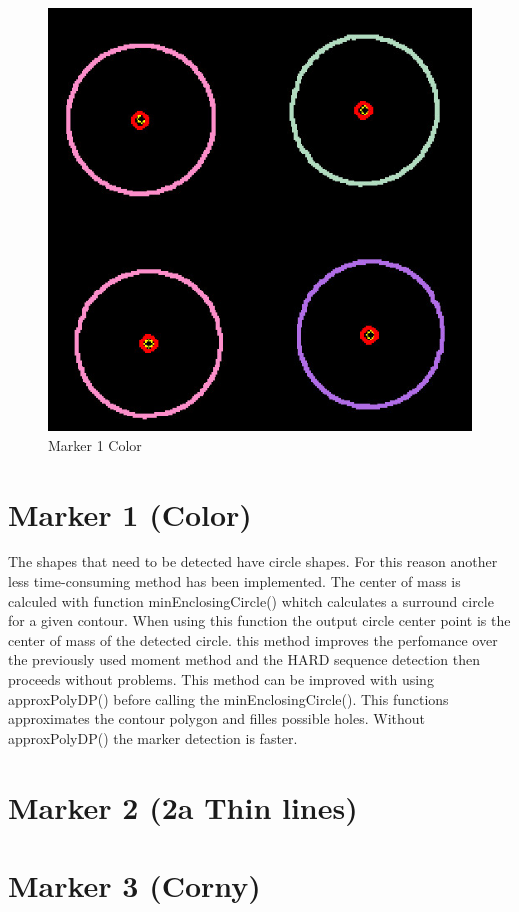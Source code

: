 \begin{figure}[ht!]
	\centering
	\includegraphics[width=\textwidth]{figures/Marker1centers}
	\caption{Marker 1 Color}
	\label{fig:markerColorcenter1}
\end{figure}
\section{Marker 1 (Color)} 

The shapes that need to be detected have circle shapes. For this reason another less time-consuming 
method has been implemented. The center of mass is calculed with function minEnclosingCircle() whitch calculates
a surround circle for a given contour. When using this function the output circle center point is the
center of mass of the detected circle. this method improves the perfomance over the previously used 
moment method and the HARD sequence detection then proceeds without problems. This method can be improved 
with using approxPolyDP() before calling the minEnclosingCircle(). This functions approximates the contour
polygon and filles possible holes. Without approxPolyDP() the marker detection is faster.
\newpage
\section{Marker 2 (2a Thin lines)}

\newpage
\section{Marker 3 (Corny)}
